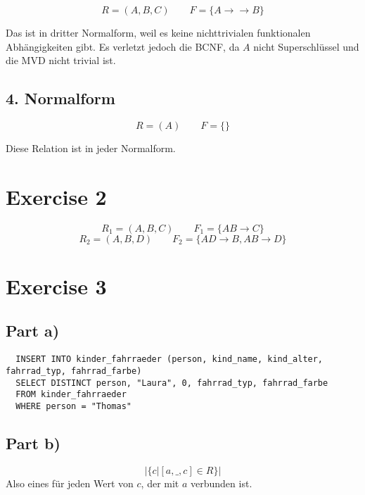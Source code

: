 \documentclass[10pt,a4paper]{article}
\begin{document}
\begin{equation*}
  R = (A, B, C) \qquad F = \{ A \rightarrow \rightarrow B \}
\end{equation*}

Das ist in dritter Normalform, weil es keine nichttrivialen funktionalen Abhängigkeiten gibt.
Es verletzt jedoch die BCNF, da $A$ nicht Superschlüssel und die MVD nicht trivial ist.

\subsection*{4. Normalform}

\begin{equation*}
  R = (A) \qquad F = \{  \}
\end{equation*}

Diese Relation ist in jeder Normalform.

\section*{Exercise 2}

\begin{equation*}
  R_{1} = (A, B, C) \qquad F_{1} = \{ AB \rightarrow C \}
\end{equation*}
\begin{equation*}
  R_{2} = (A, B, D) \qquad F_{2} = \{ AD \rightarrow B, AB \rightarrow D \}
\end{equation*}

\section*{Exercise 3}

\subsection*{Part a)}

\begin{verbatim}
  INSERT INTO kinder_fahrraeder (person, kind_name, kind_alter, fahrrad_typ, fahrrad_farbe)
  SELECT DISTINCT person, "Laura", 0, fahrrad_typ, fahrrad_farbe
  FROM kinder_fahrraeder
  WHERE person = "Thomas"
\end{verbatim}

\subsection*{Part b)}

\begin{equation*}
  |\{ c | [a, \_, c] \in R \}|
\end{equation*}
Also eines für jeden Wert von $c$, der mit $a$ verbunden ist.
\end{document}
